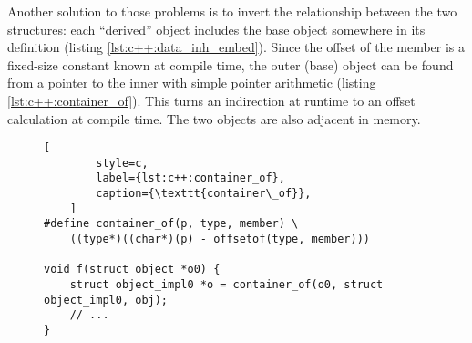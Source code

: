 Another solution to those problems is to invert the relationship between the two
structures: each ``derived'' object includes the base object somewhere in its
definition (listing \ref{lst:c++:data_inh_embed}).  Since the offset of the
member is a fixed-size constant known at compile time, the outer (base) object
can be found from a pointer to the inner with simple pointer arithmetic (listing
\ref{lst:c++:container_of}).  This turns an indirection at runtime to an offset
calculation at compile time.  The two objects are also adjacent in memory.

\begin{figure}[ht]
    \begin{lstlisting}[
        style=c,
        label={lst:c++:container_of},
        caption={\texttt{container\_of}},
    ]
#define container_of(p, type, member) \
    ((type*)((char*)(p) - offsetof(type, member)))

void f(struct object *o0) {
    struct object_impl0 *o = container_of(o0, struct object_impl0, obj);
    // ...
}
    \end{lstlisting}
\end{figure}

